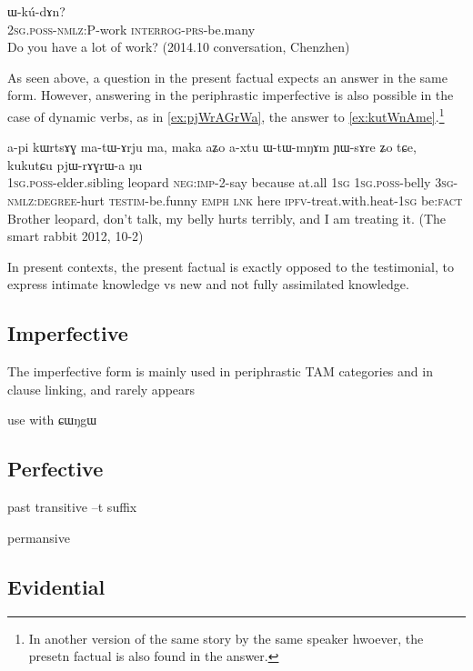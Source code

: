 \documentclass[oldfontcommands,oneside,a4paper,11pt]{article}
\newcommand{\ipa}[1]{{\phon \mbox{#1}}} %
\begin{document}
\begin{exe}
\ex \label{ex:WkudAn}
\gll \ipa{nɤ-kɤ-nɤma} 	\ipa{ɯ-kú-dɤn?}  \\
 \textsc{2sg.poss-nmlz:P}-work \textsc{interrog-prs}-be.many \\
\glt Do you have a lot of work? (2014.10 conversation, Chenzhen)
\end{exe}
 
 
As seen above, a question in the present factual expects an answer in the same form. However, answering in the periphrastic imperfective is also possible in the case of dynamic verbs, as in \ref{ex:pjWrAGrWa}, the answer to \ref{ex:kutWnAme}.\footnote{In another version of the same story by the same speaker hwoever, the presetn factual is also found in the answer.}
 \begin{exe}
\ex \label{ex:pjWrAGrWa}
\gll
 \ipa{a-pi} 	\ipa{kɯrtsɤɣ} 	\ipa{ma-tɯ-ɤrju} 	\ipa{ma,} 	\ipa{maka} 	\ipa{aʑo} 	\ipa{a-xtu} 	\ipa{ɯ-tɯ-mŋɤm} 	\ipa{ɲɯ-sɤre} 	\ipa{ʑo} 	\ipa{tɕe,} 	\ipa{kukutɕu} 	\ipa{pjɯ-rɤɣrɯ-a} 	\ipa{ŋu} 	\\
 \textsc{1sg.poss}-elder.sibling leopard \textsc{neg:imp}-2-say because at.all \textsc{1sg} \textsc{1sg.poss}-belly \textsc{3sg-nmlz:degree}-hurt \textsc{testim}-be.funny \textsc{emph} \textsc{lnk} here \textsc{ipfv}-treat.with.heat-\textsc{1sg} be:\textsc{fact}  \\
\glt Brother leopard, don't talk, my belly hurts terribly, and I am treating it. (The smart rabbit 2012, 10-2)
 \end{exe}
 
 In present contexts, the present factual is exactly opposed to the testimonial, to express intimate knowledge vs new and not fully assimilated knowledge. 


\subsection{Imperfective}
The imperfective form is mainly used in periphrastic TAM categories and in clause linking, and rarely appears 

use with \ipa{ɕɯŋgɯ} \citet{jacques14linking}

\subsection{Perfective}

past transitive \ipa{--t} suffix 

permansive
\subsection{Evidential}
\end{document}
